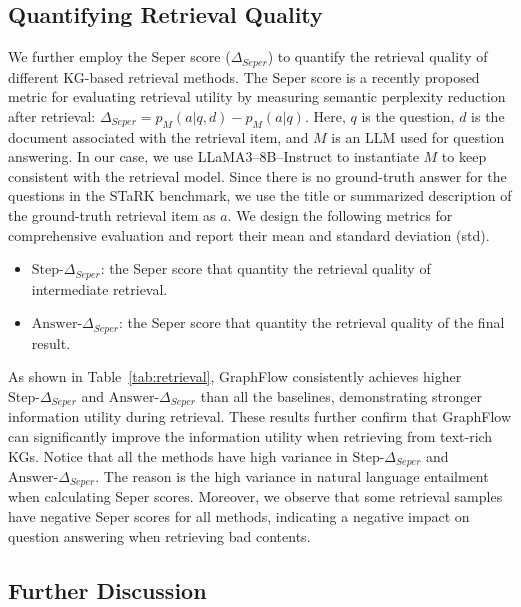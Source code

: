 \subsection{Quantifying Retrieval Quality}
We further employ the Seper score ($\Delta_{Seper}$) \cite{daiseper} to quantify the retrieval quality of different KG-based retrieval methods.
The Seper score is a recently proposed metric for evaluating retrieval utility by measuring semantic perplexity reduction after retrieval: $\Delta_{Seper}=p_{M}(a|q,d)-p_{M}(a|q)$. 
Here, $q$ is the question, $d$ is the document associated with the retrieval item, and $M$ is an LLM used for question answering. In our case, we use LLaMA3–8B–Instruct to instantiate $M$ to keep consistent with the retrieval model.
Since there is no ground-truth answer for the questions in the STaRK benchmark, we use the title or summarized description of the ground-truth retrieval item as $a$. 
We design the following metrics for comprehensive evaluation and report their mean and standard deviation (std).
\begin{itemize}
    \item $\text{Step-}\Delta_{Seper}$: the Seper score that quantity the retrieval quality of intermediate retrieval.
    \item $\text{Answer-}\Delta_{Seper}$: the Seper score that quantity the retrieval quality of the final result.
\end{itemize}
As shown in Table~\ref{tab:retrieval}, GraphFlow consistently achieves higher $\text{Step-}\Delta_{Seper}$ and $\text{Answer-}\Delta_{Seper}$ than all the baselines, demonstrating stronger information utility during retrieval. 
These results further confirm that GraphFlow can significantly improve the information utility when retrieving from text-rich KGs.
Notice that all the methods have high variance in $\text{Step-}\Delta_{Seper}$ and $\text{Answer-}\Delta_{Seper}$.
The reason is the high variance in natural language entailment when calculating Seper scores.
Moreover, we observe that some retrieval samples have negative Seper scores for all methods, indicating a negative impact on question answering when retrieving bad contents.

\subsection{Further Discussion}

